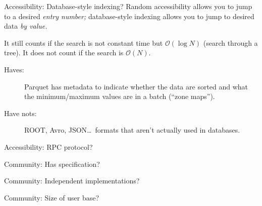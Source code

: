 \documentclass[aspectratio=169]{beamer}
\begin{document}
\begin{frame}{Accessibility: Database-style indexing?}
\vspace{0.5 cm}
Random accessibility allows you to jump to a desired {\it entry number;} database-style indexing allows you to jump to desired data {\it by value.}

\vfill
It still counts if the search is not constant time but $\mathcal{O}(\log N)$ (search through a tree). It does not count if the search is $\mathcal{O}(N)$.

\begin{description}
\item[Haves:] Parquet has metadata to indicate whether the data are sorted and what the minimum/maximum values are in a batch (``zone maps'').
\item[Have nots:] ROOT, Avro, JSON\ldots\ formats that aren't actually used in databases.
\end{description}
\end{frame}

\begin{frame}{Accessibility: RPC protocol?}
\vspace{0.5 cm}
\end{frame}

\begin{frame}{Community: Has specification?}
\vspace{0.5 cm}
\end{frame}

\begin{frame}{Community: Independent implementations?}
\vspace{0.5 cm}
\end{frame}

\begin{frame}{Community: Size of user base?}
\vspace{0.5 cm}
\end{frame}
\end{document}
